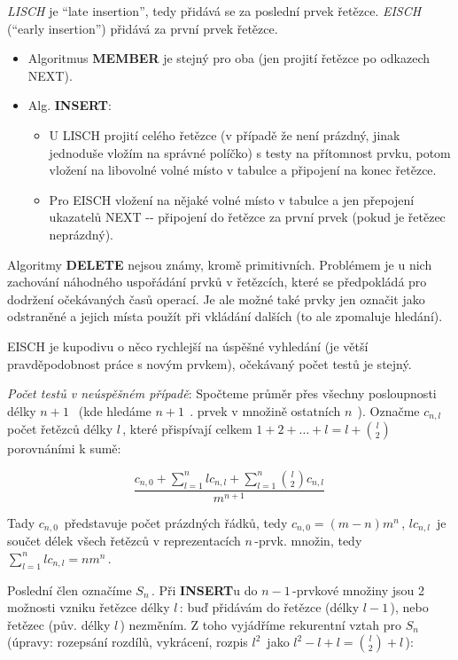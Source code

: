 \emph{LISCH} je ``late insertion'', tedy přidává se za poslední prvek
řetězce. \emph{EISCH} (``early insertion'') přidává za první prvek
řetězce.

\begin{itemize}
\tightlist
\item
  Algoritmus \textbf{MEMBER} je stejný pro oba (jen projití řetězce po
  odkazech NEXT).
\item
  Alg. \textbf{INSERT}:

  \begin{itemize}
  \tightlist
  \item
    U LISCH projití celého řetězce (v případě že není prázdný, jinak
    jednoduše vložím na správné políčko) s testy na přítomnost prvku,
    potom vložení na libovolné volné místo v tabulce a připojení na
    konec řetězce.
  \item
    Pro EISCH vložení na nějaké volné místo v tabulce a jen přepojení
    ukazatelů NEXT -\/- připojení do řetězce za první prvek (pokud je
    řetězec neprázdný).
  \end{itemize}
\end{itemize}

Algoritmy \textbf{DELETE} nejsou známy, kromě primitivních. Problémem je
u nich zachování náhodného uspořádání prvků v řetězcích, které se
předpokládá pro dodržení očekávaných časů operací. Je ale možné také
prvky jen označit jako odstraněné a jejich místa použít při vkládání
dalších (to ale zpomaluje hledání).

EISCH je kupodivu o něco rychlejší na úspěšné vyhledání (je větší
pravděpodobnost práce s novým prvkem), očekávaný počet testů je stejný.

\emph{Počet testů v neúspěšném případě}: Spočteme průměr přes všechny
posloupnosti délky \(n+1\,\;\) (kde hledáme \(n+1\,\;\). prvek v množině
ostatních \(n\,\;\)). Označme \(c_{n,l}\,\!\) počet řetězců délky
\(l\,\!\), které přispívají celkem
\(1+2+\dots+l = l + \mathbf{}\binom{l}{2}\,\!\) porovnáními k sumě:

\[\frac{c_{n,0}+\sum_{l=1}^{n}lc_{n,l}+\sum_{l=1}^{n}\mathbf{}\binom{l}{2}c_{n,l}}{m^{n+1}}\,\!\]

Tady \(c_{n,0}\,\!\) představuje počet prázdných řádků, tedy
\(c_{n,0}=(m-n)m^n\,\!\), \(lc_{n,l}\,\!\) je součet délek všech řetězců
v reprezentacích \(n\,\!\)-prvk. množin, tedy
\(\sum_{l=1}^n lc_{n,l}= nm^n\,\!\).

Poslední člen označíme \(S_n\,\!\). Při \textbf{INSERT}u do
\(n-1\,\!\)-prvkové množiny jsou 2 možnosti vzniku řetězce délky
\(l\,\!\): buď přidávám do řetězce (délky \(l-1\,\!\)), nebo řetězec
(pův. délky \(l\,\!\)) nezměním. Z toho vyjádříme rekurentní vztah pro
\(S_n\,\;\) (úpravy: rozepsání rozdílů, vykrácení, rozpis \(l^2\,\!\)
jako \(l^2-l + l=\mathbf{}\binom{l}{2}+l\,\!\)):

